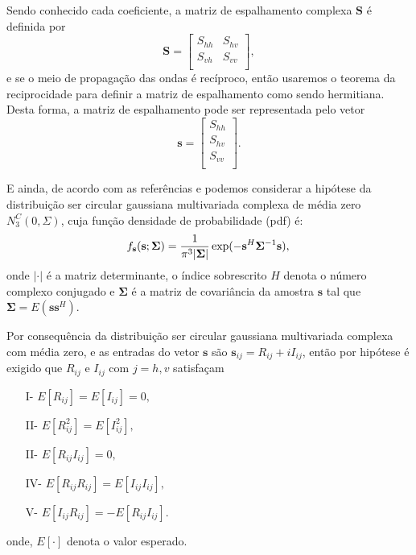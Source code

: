 \documentclass[conference]{IEEEtran}
\begin{document}
Sendo conhecido cada coeficiente, a matriz de espalhamento complexa $\mathbf{S}$ é definida por
\begin{equation}\label{eq_01}
\mathbf{S} = \left[
\begin{array}{cc}
	S_{hh}   & S_{hv}   \\
	S_{vh}   & S_{vv}   \\
\end{array}
\right],
\end{equation}
e se o meio de propagação das ondas é recíproco, então usaremos o teorema da reciprocidade \cite{lp} para definir a matriz de espalhamento como sendo hermitiana. Desta forma, a matriz de espalhamento pode ser representada pelo vetor
\begin{equation}\label{eq_02}
\mathbf{s} = \left[
\begin{array}{c}
	S_{hh}     \\
    S_{hv}     \\
	S_{vv}     \\
\end{array}
\right].
\end{equation}

E ainda, de acordo com as referências \cite{good} e \cite{lee} podemos considerar a hipótese da distribuição ser circular gaussiana multivariada complexa de média zero $N^C_3(0,\Sigma)$, cuja função densidade de probabilidade (pdf) é:
\begin{equation}\label{eq_03}
    f_{\mathbf{s}}(\mathbf{s};\mathbf{\Sigma})=\frac{1}{\pi^3|\mathbf{\Sigma}|} \exp(-\mathbf{s}^H\mathbf{\Sigma}^{-1}\mathbf{s}), \\
\end{equation}
onde $|\cdot|$ é a matriz determinante, o índice sobrescrito $H$ denota o número complexo conjugado e $\mathbf{\Sigma}$ é a matriz de covariância da amostra $\mathbf{s}$ tal que $\mathbf{\Sigma}=E(\mathbf{ss}^H)$. 

Por consequência da distribuição ser circular gaussiana multivariada complexa com média zero, e as entradas do vetor $\mathbf{s}$ são $\mathbf{s}_{ij}= R_{ij}+ i I_{ij}$, então por hipótese é exigido que $R_{ij}$ e $I_{ij}$ com $j=h,v$ satisfaçam 
\begin{itemize}
	\item[I-] $E[R_{ij}]=E[I_{ij}]=0,$
	\item[II-] $E[R_{ij}^2]=E[I_{ij}^2],$ 
	\item[II-] $E[R_{ij}I_{ij}]=0,$  
	\item[IV-] $E[R_{ij}R_{ij}]=E[I_{ij}I_{ij}],$ 
	\item[V-] $E[I_{ij}R_{ij}]=-E[R_{ij}I_{ij}].$
\end{itemize}
onde, $E[\cdot]$ denota o valor esperado. 
\end{document}
